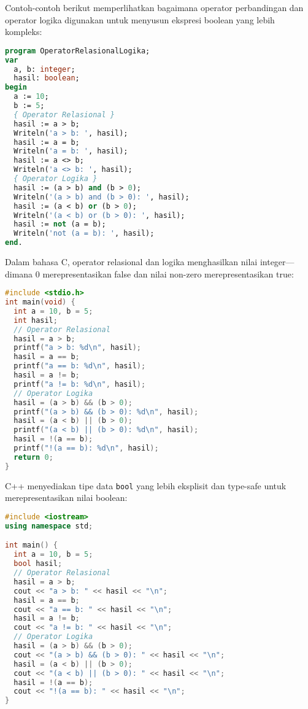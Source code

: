 \documentclass[../main.tex]{subfiles}
\begin{document}
Contoh-contoh berikut memperlihatkan bagaimana operator perbandingan dan operator logika digunakan untuk menyusun ekspresi boolean yang lebih kompleks:

\begin{lstlisting}[language=Pascal, caption={Operator relasional dan logika di Pascal}]
program OperatorRelasionalLogika;
var
  a, b: integer;
  hasil: boolean;
begin
  a := 10;
  b := 5;
  { Operator Relasional }
  hasil := a > b;
  Writeln('a > b: ', hasil);
  hasil := a = b;
  Writeln('a = b: ', hasil);
  hasil := a <> b;
  Writeln('a <> b: ', hasil);
  { Operator Logika }
  hasil := (a > b) and (b > 0);
  Writeln('(a > b) and (b > 0): ', hasil);
  hasil := (a < b) or (b > 0);
  Writeln('(a < b) or (b > 0): ', hasil);
  hasil := not (a = b);
  Writeln('not (a = b): ', hasil);
end.
\end{lstlisting}

Dalam bahasa C, operator relasional dan logika menghasilkan nilai integer—dimana 0 merepresentasikan false dan nilai non-zero merepresentasikan true:

\begin{lstlisting}[language=C, caption={Operator relasional dan logika di C}]
#include <stdio.h>
int main(void) {
  int a = 10, b = 5;
  int hasil;
  // Operator Relasional
  hasil = a > b;
  printf("a > b: %d\n", hasil);
  hasil = a == b;
  printf("a == b: %d\n", hasil);
  hasil = a != b;
  printf("a != b: %d\n", hasil);
  // Operator Logika
  hasil = (a > b) && (b > 0);
  printf("(a > b) && (b > 0): %d\n", hasil);
  hasil = (a < b) || (b > 0);
  printf("(a < b) || (b > 0): %d\n", hasil);
  hasil = !(a == b);
  printf("!(a == b): %d\n", hasil);
  return 0;
}
\end{lstlisting}

C++ menyediakan tipe data \texttt{bool} yang lebih eksplisit dan type-safe untuk merepresentasikan nilai boolean:

\begin{lstlisting}[language=C++, caption={Operator relasional dan logika di C++}]
#include <iostream>
using namespace std;

int main() {
  int a = 10, b = 5;
  bool hasil;
  // Operator Relasional
  hasil = a > b;
  cout << "a > b: " << hasil << "\n";
  hasil = a == b;
  cout << "a == b: " << hasil << "\n";
  hasil = a != b;
  cout << "a != b: " << hasil << "\n";
  // Operator Logika
  hasil = (a > b) && (b > 0);
  cout << "(a > b) && (b > 0): " << hasil << "\n";
  hasil = (a < b) || (b > 0);
  cout << "(a < b) || (b > 0): " << hasil << "\n";
  hasil = !(a == b);
  cout << "!(a == b): " << hasil << "\n";
}
\end{lstlisting}
\end{document}
